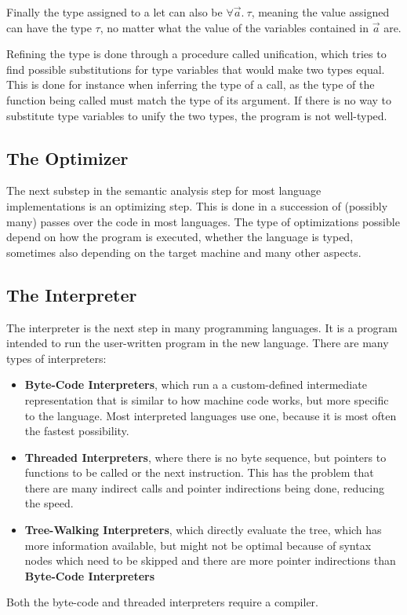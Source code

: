 \documentclass[12pt]{article}
\begin{document}
Finally the type assigned to a let can also be
$\forall \vec{a}.\:\tau$, meaning the value assigned
can have the type $\tau$, no matter what the value of the variables contained in $\vec{a}$ are.

Refining the type is done through a procedure called unification,
which tries to find possible substitutions for type variables that would make two
types equal. This is done for instance when inferring the type of a call,
as the type of the function being called must match
the type of its argument.
If there is no way to substitute type variables
to unify the two types, the program is not well-typed.

\subsection{The Optimizer}
The next substep in the semantic analysis step for most language implementations is an optimizing step.
This is done in a succession of (possibly many) passes over the code in most languages. The type of optimizations
possible depend on how the program is executed, whether the language is typed,
sometimes also depending on the target machine and many other aspects.

\subsection{The Interpreter}
The interpreter is the next step in many programming languages.
It is a program intended to run the user-written program in the new
language. There are many types of interpreters:
\begin{itemize}
	\item \textbf{Byte-Code Interpreters}, which run a
	      a custom-defined intermediate representation that is similar to how
	      machine code works, but more specific to the language. Most interpreted languages
	      use one, because it is most often the fastest possibility.
	\item \textbf{Threaded Interpreters}, where there is no byte sequence, but pointers
	      to functions to be called or the next instruction. This has the problem that there
	      are many indirect calls and pointer indirections being done, reducing the speed.
	\item \textbf{Tree-Walking Interpreters}, which directly evaluate the tree,
	      which has more information available, but might not be optimal because of syntax
	      nodes which need to be skipped and there are more pointer indirections than
	      \textbf{Byte-Code Interpreters}
\end{itemize}
Both the byte-code and threaded interpreters require a compiler.
\end{document}
